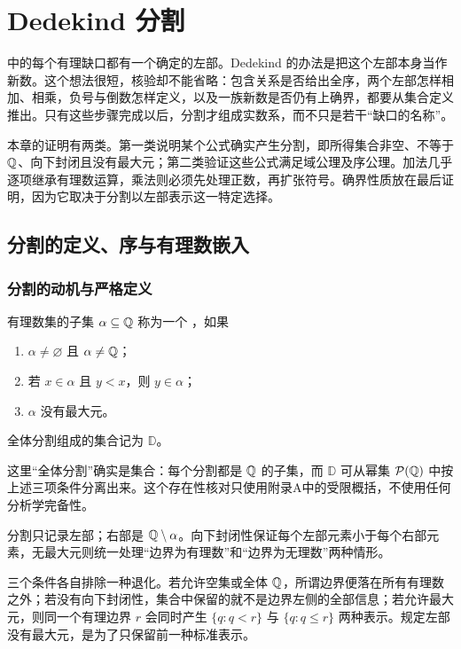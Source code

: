 \chapter{Dedekind 分割}
\label{chap:dedekind-construction}

中的每个有理缺口都有一个确定的左部。Dedekind 的办法是把这个左部本身当作新数。这个想法很短，核验却不能省略：包含关系是否给出全序，两个左部怎样相加、相乘，负号与倒数怎样定义，以及一族新数是否仍有上确界，都要从集合定义推出。只有这些步骤完成以后，分割才组成实数系，而不只是若干“缺口的名称”。

本章的证明有两类。第一类说明某个公式确实产生分割，即所得集合非空、不等于 \(\mathbb{Q}\)、向下封闭且没有最大元；第二类验证这些公式满足域公理及序公理。加法几乎逐项继承有理数运算，乘法则必须先处理正数，再扩张符号。确界性质放在最后证明，因为它取决于分割以左部表示这一特定选择。

\section{分割的定义、序与有理数嵌入}

\subsection{分割的动机与严格定义}


\begin{definition}
有理数集的子集 \(\alpha\subseteq\mathbb{Q}\) 称为一个 ，如果
\begin{enumerate}
 \item \(\alpha\ne\varnothing\) 且 \(\alpha\ne\mathbb{Q}\)；
 \item 若 \(x\in\alpha\) 且 \(y<x\)，则 \(y\in\alpha\)；
 \item \(\alpha\) 没有最大元。
\end{enumerate}
全体分割组成的集合记为 \(\mathbb D\)。
\end{definition}

这里“全体分割”确实是集合：每个分割都是 \(\mathbb{Q}\) 的子集，而
\(\mathbb D\) 可从幂集 \(\mathcal P(\mathbb{Q})\) 中按上述三项条件分离出来。这个存在性核对只使用附录A中的受限概括，不使用任何分析学完备性。

分割只记录左部；右部是 \(\mathbb{Q}\setminus\alpha\)。向下封闭性保证每个左部元素小于每个右部元素，无最大元则统一处理“边界为有理数”和“边界为无理数”两种情形。

三个条件各自排除一种退化。若允许空集或全体 \(\mathbb{Q}\)，所谓边界便落在所有有理数之外；若没有向下封闭性，集合中保留的就不是边界左侧的全部信息；若允许最大元，则同一个有理边界 \(r\) 会同时产生 \(\{q:q<r\}\) 与 \(\{q:q\le r\}\) 两种表示。规定左部没有最大元，是为了只保留前一种标准表示。

